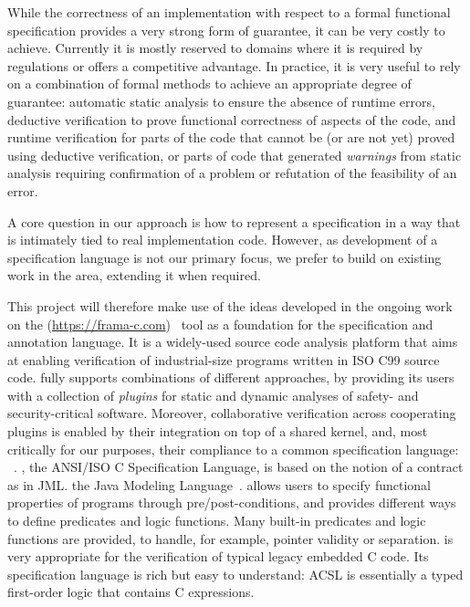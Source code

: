 While the correctness of an implementation with respect to a formal functional specification provides a very strong form of guarantee, it can be very costly to achieve.
Currently it is mostly reserved to domains where it is required by regulations or offers a competitive advantage.
In practice, it is very useful to rely on a combination of formal methods to achieve an appropriate degree of guarantee:
automatic static analysis to ensure the absence of runtime errors,
deductive verification to prove functional correctness of aspects of the code,
and runtime verification for parts of the code that cannot be (or are not yet) proved using deductive verification,
or parts of code that generated \emph{warnings} from static analysis requiring confirmation of a problem or refutation of the feasibility of an error.

A core question in our approach is how to represent a specification in a way that is intimately tied to real implementation code.  However, as development of a specification language is not our primary focus, we prefer to build on existing work in the area, extending it when required.

This project will therefore make use of the ideas developed in the ongoing work on the \framac{} (\url{https://frama-c.com})~\cite{KKP2015:FAC} tool as a foundation for the specification and annotation language.
It is a widely-used source code analysis platform that aims at enabling verification of industrial-size programs written in ISO C99 source code.
\framac{} fully supports combinations of different approaches, by providing its users with a collection of \emph{plugins} for static and dynamic analyses of safety- and security-critical software.
Moreover, collaborative verification across cooperating plugins is enabled by their integration on top of a shared kernel, and, most critically for our purposes, their compliance to a common specification language: \acsl~\cite{ACSL}.
\acsl, the ANSI/ISO C Specification Language, is based on the notion of a contract as in JML. the Java Modeling Language~\cite{jml}.
\acsl allows users to specify functional properties of programs through pre/post-conditions, and provides different ways to define predicates and logic functions.
Many built-in predicates and logic functions are provided, to handle, for example, pointer validity or separation.
\framac is very appropriate for the verification of typical legacy embedded C code.
Its specification language is rich but easy to understand: ACSL is essentially a typed first-order logic that contains C expressions.

